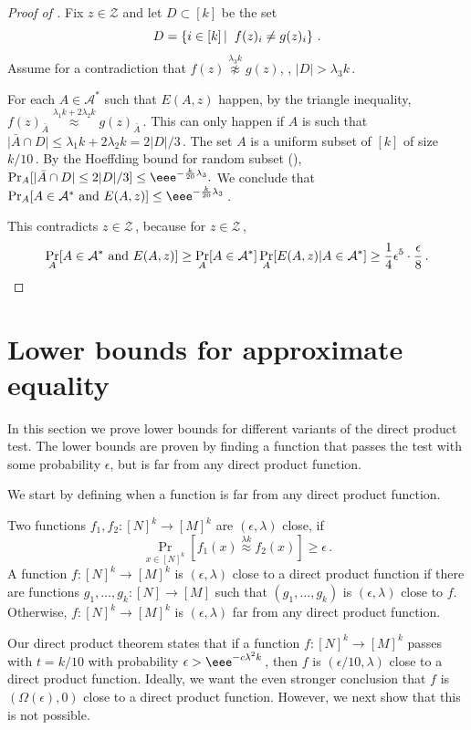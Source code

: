 \documentclass{toc}
\newcommand{\Prob}[2][]{\Pr_{{#1}}\left[#2\right]} %
\newcommand{\brac}[1]{[#1]} %
\newcommand{\abs}[1]{\lvert#1\rvert} %
\newcommand\sett[2]{\left\{ #1 \left| \; \vphantom{#1 #2} \right. #2  \right\}} %
\newcommand\f{f} %
\newcommand\pf{g} %
\newcommand\neql[1]{\stackrel{{#1}}{ \approx}} %
\newcommand\neqg[1]{\stackrel{{#1}}{ \not\approx}} %
\newcommand\rest[1]{{\bar{#1}}}  %
\newcommand\zi{\mathcal{Z}} %
\begin{document}
\begin{proof}[Proof of ]
Fix $z\in\zi$ and let $D\subset [k]$ be the set
	\[D = \sett{i\in[k]}{\f(z)_i\neq\pf(z)_i} \,.\] %
Assume %
for   %
a contradiction that $\f(z)\neqg{\lambda_3 k}\pf(z)$, \ie, $\abs{D} >\lambda_3 k$\,.
	
For each $A\in\mathcal{A}^*$ such that $E(A,z)$ happen, by the triangle inequality,
$\f(z)_{\rest{A}} \neql{\lambda_1 k + 2\lambda_2 k} \pf(z)_{\rest{A}}$\,.
This can only happen if $A$ is such that $\abs{\rest{A}\cap D}\leq \lambda_1 k + 2\lambda_2 k =
%
2\abs{D}/3$\,. %
The set $A$ is a uniform subset of $[k]$ of size $k/10$\,. By
the  %
%
%
%
Hoeffding bound for random subset (), %
%
$\Pr_A[\abs{\rest{A}\cap D}\leq 
%
2\abs{D}/3]%
\leq \eee^{-\frac{ k}{20}\lambda_3}.$
We conclude that $\Pr_A[A\in \mathcal{A}^*\textrm{ and }E(A,z)]\leq \eee^{-\frac{ k}{20}\lambda_3}$\,.

This contradicts $z\in\zi$\,, because for $z\in\zi$\,,
%
\[\Pr_A[A\in \mathcal{A}^*\textrm{ and }E(A,z)]\geq \Pr_A[A\in\mathcal{A}^*]\Pr_A[E(A,z)| A\in\mathcal{A}^*]\geq \frac{1}{4}\epsilon^5 \cdot \frac{\epsilon}{8}\,.  \qedhere \]   %
\end{proof}


\section{Lower bounds for approximate equality} \label{sec:diss}
In this section we prove lower bounds for different variants of the direct product test. The lower bounds are proven by finding a  function that passes the test with some probability $\epsilon$, but is far from any direct product function.

We start by defining when a function is far from any direct product function.
\begin{definition}
	Two functions $\f_1,\f_2:[N]^k\rightarrow[M]^k$ are $(\epsilon,\lambda)$ close, if
	\[ \Prob[x\in\brac{N}^k]{\f_1(x)\neql{\lambda k} \f_2(x)}\geq \epsilon\,. \] %
	A function $\f:[N]^k\rightarrow[M]^k$ is $(\epsilon,\lambda)$ close to a direct product function if there are functions $\pf_1,\ldots,\pf_k:[N]\rightarrow[M]$ such that $(g_1,\ldots, g_k)$ is $(\epsilon,\lambda)$ close to $\f$. Otherwise,  $\f:[N]^k\rightarrow[M]^k$ is $(\epsilon,\lambda)$ far from any direct product function.
\end{definition}

Our direct product theorem states that if a function $\f:[N]^k\rightarrow[M]^k$ passes  with $t=k/10$ with probability $\epsilon > \eee^{-c \lambda^2 k}$\,, then $\f$ is 
%
$({\epsilon}/{10},\lambda)$ %
 close to a direct product function.
Ideally, we want the even stronger conclusion that $\f$ is $(\Omega(\epsilon),0)$ close to a direct product function. However, we next show that this is not possible.
\end{document}

